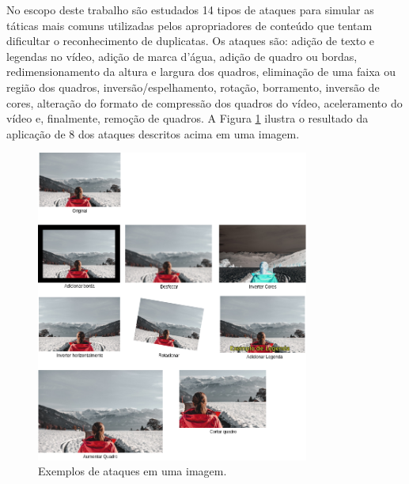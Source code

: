 	No escopo deste trabalho são estudados 14 tipos de ataques para simular as táticas mais comuns utilizadas pelos apropriadores de conteúdo que tentam dificultar o reconhecimento de duplicatas. Os ataques são: adição de texto e legendas no vídeo, adição de marca d'água, adição de quadro ou bordas, redimensionamento da altura e largura dos quadros, eliminação de uma faixa ou região dos quadros, inversão/espelhamento, rotação, borramento, inversão de cores, alteração do formato de compressão dos quadros do vídeo, aceleramento do vídeo e, finalmente, remoção de quadros. A Figura \ref{fig:ataques} ilustra o resultado da aplicação de 8 dos ataques descritos acima em uma imagem.

    \begin{figure}[h]
        \centering
         \caption{Exemplos de ataques em uma imagem.}
        \includegraphics[width=0.8\textwidth]{dados/figuras/Ataques.png}
       
        
    	\label{fig:ataques}
    \end{figure}

